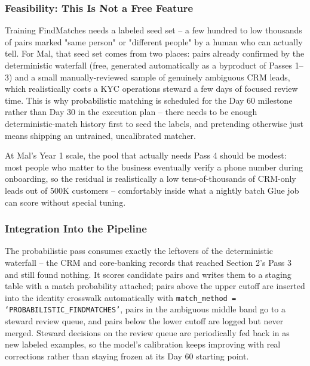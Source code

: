 \documentclass[11pt]{article}
\begin{document}
\subsubsection*{Feasibility: This Is Not a Free Feature}
Training FindMatches needs a labeled seed set -- a few hundred to low thousands of pairs marked "same person" or "different people" by a human who can actually tell. For Mal, that seed set comes from two places: pairs already confirmed by the deterministic waterfall (free, generated automatically as a byproduct of Passes 1--3) and a small manually-reviewed sample of genuinely ambiguous CRM leads, which realistically costs a KYC operations steward a few days of focused review time. This is why probabilistic matching is scheduled for the Day 60 milestone rather than Day 30 in the execution plan -- there needs to be enough deterministic-match history first to seed the labels, and pretending otherwise just means shipping an untrained, uncalibrated matcher.

At Mal's Year 1 scale, the pool that actually needs Pass 4 should be modest: most people who matter to the business eventually verify a phone number during onboarding, so the residual is realistically a low tens-of-thousands of CRM-only leads out of 500K customers -- comfortably inside what a nightly batch Glue job can score without special tuning.

\subsubsection*{Integration Into the Pipeline}
The probabilistic pass consumes exactly the leftovers of the deterministic waterfall -- the CRM and core-banking records that reached Section 2's Pass 3 and still found nothing. It scores candidate pairs and writes them to a staging table with a match probability attached; pairs above the upper cutoff are inserted into the identity crosswalk automatically with \texttt{match\_method = `PROBABILISTIC\_FINDMATCHES'}, pairs in the ambiguous middle band go to a steward review queue, and pairs below the lower cutoff are logged but never merged. Steward decisions on the review queue are periodically fed back in as new labeled examples, so the model's calibration keeps improving with real corrections rather than staying frozen at its Day 60 starting point.
\end{document}
